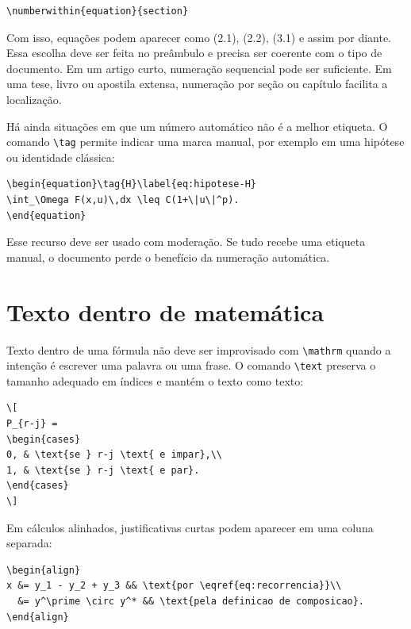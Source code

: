 \begin{lstlisting}[language={[latex]TeX}, caption={Numeração por seção}]
\numberwithin{equation}{section}
\end{lstlisting}

Com isso, equações podem aparecer como (2.1), (2.2), (3.1) e assim por diante. Essa escolha deve ser feita no preâmbulo e precisa ser coerente com o tipo de documento. Em um artigo curto, numeração sequencial pode ser suficiente. Em uma tese, livro ou apostila extensa, numeração por seção ou capítulo facilita a localização.

Há ainda situações em que um número automático não é a melhor etiqueta. O comando \verb|\tag| permite indicar uma marca manual, por exemplo em uma hipótese ou identidade clássica:

\begin{lstlisting}[language={[latex]TeX}, caption={Etiqueta manual com tag}]
\begin{equation}\tag{H}\label{eq:hipotese-H}
\int_\Omega F(x,u)\,dx \leq C(1+\|u\|^p).
\end{equation}
\end{lstlisting}

Esse recurso deve ser usado com moderação. Se tudo recebe uma etiqueta manual, o documento perde o benefício da numeração automática.

\section{Texto dentro de matemática}

Texto dentro de uma fórmula não deve ser improvisado com \verb|\mathrm| quando a intenção é escrever uma palavra ou uma frase. O comando \verb|\text| preserva o tamanho adequado em índices e mantém o texto como texto:

\begin{lstlisting}[language={[latex]TeX}, caption={Texto em uma fórmula}]
\[
P_{r-j} =
\begin{cases}
0, & \text{se } r-j \text{ e impar},\\
1, & \text{se } r-j \text{ e par}.
\end{cases}
\]
\end{lstlisting}

Em cálculos alinhados, justificativas curtas podem aparecer em uma coluna separada:

\begin{lstlisting}[language={[latex]TeX}, caption={Justificativas em align}]
\begin{align}
x &= y_1 - y_2 + y_3 && \text{por \eqref{eq:recorrencia}}\\
  &= y^\prime \circ y^* && \text{pela definicao de composicao}.
\end{align}
\end{lstlisting}

